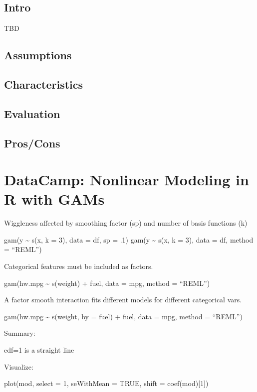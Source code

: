 \documentclass[]{book}
\begin{document}
\subsection{Intro}\label{intro-15}

TBD

\subsection{Assumptions}\label{assumptions-14}

\subsection{Characteristics}\label{characteristics-11}

\subsection{Evaluation}\label{evaluation-14}

\subsection{Pros/Cons}\label{proscons-15}

\section{DataCamp: Nonlinear Modeling in R with
GAMs}\label{datacamp-nonlinear-modeling-in-r-with-gams}

Wiggleness affected by smoothing factor (sp) and number of basis
functions (k)

gam(y \textasciitilde{} s(x, k = 3), data = df, sp = .1) gam(y
\textasciitilde{} s(x, k = 3), data = df, method = ``REML'')

Categorical features must be included as factors.

gam(hw.mpg \textasciitilde{} s(weight) + fuel, data = mpg, method =
``REML'')

A factor smooth interaction fits different models for different
categorical vars.

gam(hw.mpg \textasciitilde{} s(weight, by = fuel) + fuel, data = mpg,
method = ``REML'')

Summary:

edf=1 is a straight line

Visualize:

plot(mod, select = 1, seWithMean = TRUE, shift = coef(mod){[}1{]})
\end{document}
